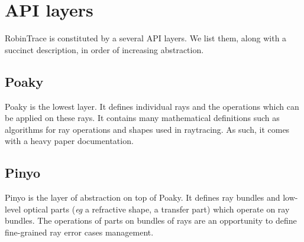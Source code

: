 \section{API layers}
RobinTrace is constituted by a several API layers. We list them, along with a
succinct description, in order of increasing abstraction.

\subsection{Poaky}
Poaky is the lowest layer. It defines individual rays and the operations which
can be applied on these rays. It contains many mathematical definitions
such as algorithms for ray operations and shapes used in raytracing. As such,
it comes with a heavy paper documentation.

\subsection{Pinyo}
Pinyo is the layer of abstraction on top of Poaky. It defines ray bundles and
low-level optical parts (\textit{eg} a refractive shape, a transfer part) which
operate on ray bundles. The operations of parts on bundles of rays are an
opportunity to define fine-grained ray error cases management.
